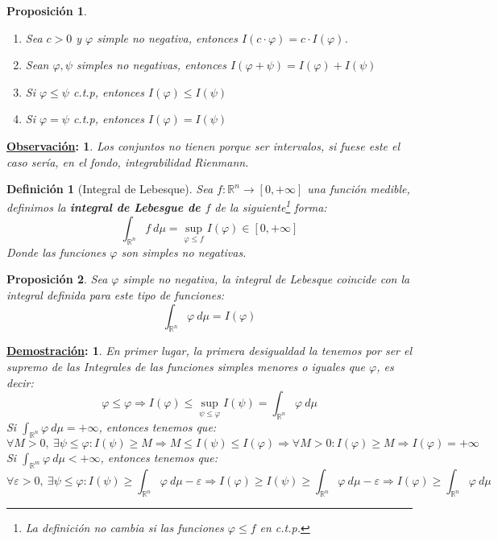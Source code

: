 \documentclass[10pt,a4paper,openright]{book}
\theoremstyle{break}
\newtheorem*{defi}{Definición}
\newtheorem*{prop}{Proposición}
\newtheorem*{demo}{\underline{Demostración}:}
\newtheorem*{obs}{\underline{Observación}:}
\begin{document}
\begin{prop}
\begin{enumerate}
    \item Sea $c > 0$ y $\varphi$ simple no negativa, entonces $I\left(c\cdot \varphi\right) = c\cdot I\left(\varphi\right)$.
    \item Sean $\varphi, \psi$ simples no negativas, entonces $I\left(\varphi + \psi\right) = I\left(\varphi\right) + I\left(\psi\right)$
    \item Si $\varphi \le \psi$ c.t.p, entonces $I\left(\varphi\right) \le I\left(\psi\right)$
    \item Si $\varphi = \psi$ c.t.p, entonces $I\left(\varphi\right) = I\left(\psi\right)$
\end{enumerate}
\end{prop}
\begin{obs}
Los conjuntos no tienen porque ser intervalos, si fuese este el caso sería, en el fondo, integrabilidad Rienmann.
\end{obs}

\begin{defi}[Integral de Lebesque]
Sea $f: \mathbb{R}^n \rightarrow \left[0, +\infty\right]$ una función medible, definimos la \textbf{integral de Lebesgue de $f$} de la siguiente\footnote{La definición no cambia si las funciones $\varphi \leq f$ en c.t.p.} forma:
$$\int_{\mathbb{R}^n}f \ d\mu = \sup_{\varphi \leq f} I\left(\varphi\right) \in \left[0, +\infty\right]$$
Donde las funciones $\varphi$ son simples no negativas.
\end{defi}

\begin{prop}
Sea $\varphi$ simple no negativa, la integral de Lebesque coincide con la integral definida para este tipo de funciones:
$$\int_{\mathbb{R}^n}\varphi \ d \mu = I\left(\varphi\right)$$
\end{prop}
\begin{demo}
En primer lugar, la primera desigualdad la tenemos por ser el supremo de las Integrales de las funciones simples menores o iguales que $\varphi$, es decir:
$$\varphi \le \varphi \Rightarrow I\left(\varphi\right) \leq \sup_{\psi \leq \varphi} I(\psi) = \int_{\mathbb{R}^n} \varphi \ d \mu $$
Si $\int_{\mathbb{R}^n} \varphi \ d \mu = +\infty$, entonces tenemos que:
$$\forall M > 0,\ \exists \psi \le \varphi: I\left(\psi\right) \ge M \Rightarrow M \le I\left(\psi\right) \le I\left(\varphi\right) \Rightarrow \forall M > 0: I\left(\varphi\right) \ge M \Rightarrow I\left(\varphi\right) = +\infty$$
Si $\int_{\mathbb{R}^m}\varphi \ d \mu < +\infty$, entonces tenemos que:
$$\forall \varepsilon > 0,\ \exists \psi \le \varphi: I\left(\psi\right) \ge \int_{\mathbb{R}^n}\varphi \ d \mu - \varepsilon \Rightarrow I\left(\varphi\right) \ge I(\psi) \geq  \int_{\mathbb{R}^n}\varphi \ d \mu - \varepsilon \Rightarrow I\left(\varphi\right) \ge \int_{\mathbb{R}^n}\varphi \ d \mu$$
\end{demo}
\end{document}
